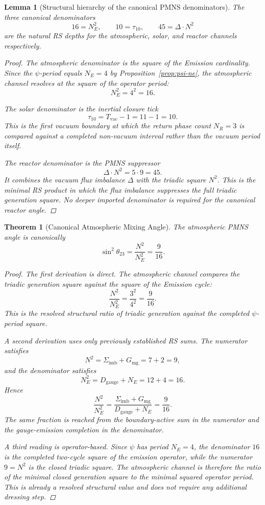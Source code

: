 \documentclass[11pt, letterpaper]{article}
\theoremstyle{definition}
\theoremstyle{plain}
\newtheorem{theorem}{Theorem}[section]
\newtheorem{lemma}{Lemma}[section]
\begin{document}
\begin{lemma}[Structural hierarchy of the canonical PMNS denominators]
The three canonical denominators
\[
16 = N_E^2, \qquad 10 = \tau_{10}, \qquad 45 = \Delta \cdot N^2
\]
are the natural RS depths for the atmospheric, solar, and reactor channels
respectively.

\begin{proof}
The atmospheric denominator is the square of the Emission cardinality. Since
the $\psi$-period equals $N_E=4$ by Proposition~\ref{prop:psi-ne}, the
atmospheric channel resolves at the square of the operator period:
\[
N_E^2 = 4^2 = 16.
\]

The solar denominator is the inertial closure tick
\[
\tau_{10} = T_{\mathrm{vac}} - 1 = 11 - 1 = 10.
\]
This is the first vacuum boundary at which the return phase count $N_R=3$
is compared against a completed non-vacuum interval rather than the vacuum
period itself.

The reactor denominator is the PMNS suppressor
\[
\Delta \cdot N^2 = 5 \cdot 9 = 45.
\]
It combines the vacuum flux imbalance $\Delta$ with the triadic square $N^2$.
This is the minimal RS product in which the flux imbalance suppresses the full
triadic generation square. No deeper imported denominator is required for the
canonical reactor angle.
\end{proof}
\end{lemma}

\begin{theorem}[Canonical Atmospheric Mixing Angle]
The atmospheric PMNS angle is canonically
\[
\sin^2\theta_{23} = \frac{N^2}{N_E^2} = \frac{9}{16}.
\]

\begin{proof}
The first derivation is direct. The atmospheric channel compares the triadic
generation square against the square of the Emission cycle:
\[
\frac{N^2}{N_E^2} = \frac{3^2}{4^2} = \frac{9}{16}.
\]
This is the resolved structural ratio of triadic generation against the
completed $\psi$-period square.

A second derivation uses only previously established RS sums. The numerator
satisfies
\[
N^2 = \Sigma_{\mathrm{imb}} + G_{\mathrm{mg}} = 7 + 2 = 9,
\]
and the denominator satisfies
\[
N_E^2 = D_{\mathrm{gauge}} + N_E = 12 + 4 = 16.
\]
Hence
\[
\frac{N^2}{N_E^2}
=
\frac{\Sigma_{\mathrm{imb}} + G_{\mathrm{mg}}}{D_{\mathrm{gauge}} + N_E}
=
\frac{9}{16}.
\]
The same fraction is reached from the boundary-active sum in the numerator and
the gauge-emission completion in the denominator.

A third reading is operator-based. Since $\psi$ has period $N_E=4$, the
denominator $16$ is the completed two-cycle square of the emission operator,
while the numerator $9=N^2$ is the closed triadic square. The atmospheric
channel is therefore the ratio of the minimal closed generation square to the
minimal squared operator period. This is already a resolved structural value
and does not require any additional dressing step.
\end{proof}
\end{theorem}
\end{document}
